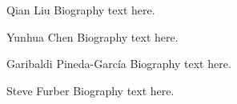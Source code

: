 \documentclass[10pt,journal,compsoc]{IEEEtran}
\begin{document}
\begin{IEEEbiography}{Qian Liu}
Biography text here.
\end{IEEEbiography}

\begin{IEEEbiographynophoto}{Yunhua Chen}
Biography text here.
\end{IEEEbiographynophoto}


\begin{IEEEbiographynophoto}{Garibaldi Pineda-Garc\'ia}
Biography text here.
\end{IEEEbiographynophoto}

\begin{IEEEbiographynophoto}{Steve Furber}
Biography text here.
\end{IEEEbiographynophoto}






\end{document}
